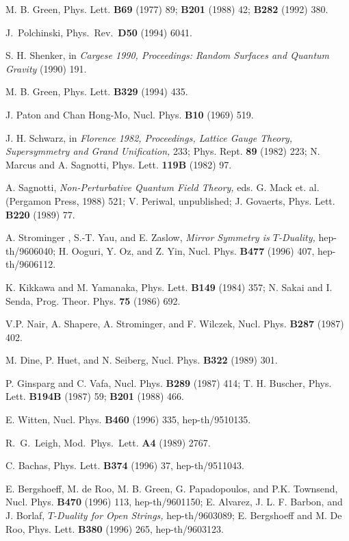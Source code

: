 \documentclass[12pt]{article}
\begin{document}
\begin{thebibliography}{99}
M. B. Green, Phys. Lett. {\bf B69} (1977) 89; {\bf
B201} (1988) 42; {\bf B282} (1992) 380.

J.~Polchinski, Phys.~Rev.~{\bf D50} (1994) 6041.

S. H. Shenker, in {\it Cargese 1990, Proceedings:  Random Surfaces and Quantum
Gravity} (1990) 191.

M. B. Green, Phys. Lett. {\bf B329} (1994) 435.

J. Paton and Chan Hong-Mo, Nucl. Phys. {\bf B10} (1969)
519.

J. H. Schwarz, in {\it Florence 1982, Proceedings, Lattice Gauge Theory,
Supersymmetry and Grand Unification,} 233; Phys. Rept. {\bf 89} (1982)
223;\hfil\break
N. Marcus and A. Sagnotti, Phys. Lett. {\bf 119B} (1982) 97.

A. Sagnotti, {\it
Non-Perturbative Quantum Field Theory,}
eds. G. Mack et. al. (Pergamon Press, 1988) 521;\hfil\break
V. Periwal, unpublished;\hfil\break
J. Govaerts, Phys. Lett. {\bf B220} (1989) 77.

A. Strominger , S.-T. Yau, and E. Zaslow, {\it Mirror Symmetry is
$T$-Duality,} hep-th/9606040;\hfil\break
H. Ooguri, Y. Oz, and Z. Yin, Nucl. Phys. {\bf B477} (1996) 407, 
hep-th/9606112.

K. Kikkawa and M. Yamanaka, Phys. Lett. {\bf B149} (1984) 357;\hfil\break 
N. Sakai and I. Senda, Prog. Theor. Phys. {\bf 75} (1986) 692.

V.P. Nair, A. Shapere, A. Strominger, and F. Wilczek,
Nucl. Phys. {\bf B287} (1987) 402.

M. Dine, P. Huet, and N. Seiberg, Nucl. Phys. {\bf
B322} (1989) 301.

P. Ginsparg and C. Vafa, Nucl. Phys. {\bf B289} (1987) 414;\hfil\break 
T. H. Buscher, Phys. Lett. {\bf B194B} (1987) 59; {\bf B201} (1988) 466. 

E. Witten, Nucl. Phys. {\bf B460} (1996) 335, hep-th/9510135.

R.~G.~Leigh, Mod.~Phys.~Lett. {\bf A4} (1989) 2767.

C. Bachas, Phys. Lett. {\bf B374} (1996) 37, hep-th/9511043.

E. Bergshoeff, M. de Roo, M. B. Green, G. Papadopoulos, and P.K.
Townsend, Nucl. Phys. {\bf B470} (1996) 113, hep-th/9601150;\hfil\break
E. Alvarez, J. L. F. Barbon, and J. Borlaf, {\it $T$-Duality for Open
Strings,} hep-th/9603089;\hfil\break
E. Bergshoeff and M. De Roo, Phys. Lett. {\bf B380} (1996) 265,
hep-th/9603123.


\end{thebibliography}
\end{document}
